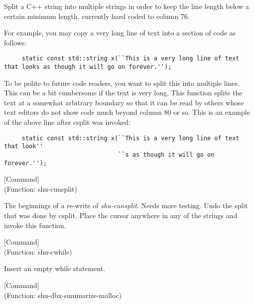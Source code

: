 \begin{doc-string}
Split a C++ string into multiple strings in order to keep the line length
below a certain minimum length, currently hard coded to column 76.

For example, you may copy a very long line of text into a section of code as
follows:

\small{\begin{verbatim}
     static const std::string x(``This is a very long line of text that looks as though it will go on forever.'');
\end{verbatim}}

To be polite to future code readers, you want to split this into multiple lines.
This can be a bit cumbersome if the text is very long.  This function splits the
text at a somewhat arbitrary boundary so that it can be read by others whose
text editors do not show code much beyond column 80 or so.  This is an example
of the above line after csplit was invoked:

\small{\begin{verbatim}
     static const std::string x(``This is a very long line of text that look''
                                ``s as though it will go on forever.'');
\end{verbatim}}
\end{doc-string}

\vspace{1em}
\noindent
{}
\usebox{\funcname}
 \hfill [Command]\\%
 (Function: shu-cunsplit)

\begin{doc-string}
The beginnings of a re-write of \emph{shu-cunsplit}.
Needs more testing.
Undo the split that was done by csplit.  Place the cursor anywhere
in any of the strings and invoke this function.
\end{doc-string}

\vspace{1em}
\noindent
{}
\usebox{\funcname}
 \hfill [Command]\\%
 (Function: shu-cwhile)

\begin{doc-string}
Insert an empty while statement.
\end{doc-string}

\vspace{1em}
\noindent
{}
\usebox{\funcname}
 \hfill [Command]\\%
 (Function: shu-dbx-summarize-malloc)

